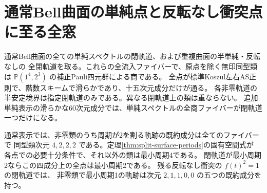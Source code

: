 \section{通常Bell曲面の単純点と反転なし衝突点に至る全窓}
\label{sec:split-surface-all-fibers}
\begin{theorem}\label{thm:split-surface-all-fibers}
通常Bell曲面の全ての単純スペクトルの閉軌道、および重複曲面の半単純・反転なしの
全閉軌道を取る。これらの全流入ファイバーで、原点を除く無印同型類は
$\mathbb P(1^4,2^3)$ の補正Pauli四元群による商である。
全点が標準Koszul左右AS正則で、階数スキームで滑らかであり、十五次元成分だけが通る。
各非零軌道の半安定境界は指定閉軌道のみである。異なる閉軌道上の類は重ならない。
追加単純表示の滑らかな60次元成分では、単純スペクトルの全商ファイバーが閉軌道一つだけになる。

通常表示では、非零類のうち周期が2を割る軌跡の既約成分は全てのファイバーで
同型類次元 $4,2,2,2$ である。定理\ref{thm:split-surface-periods}の固有空間式が
各点での必要十分条件で、それ以外の類は最小周期4である。
閉軌道が最小周期2ならこの四成分上の全点は最小周期2である。
残る反転なし衝突の $f(t)^2=1$ の閉軌道では、
非零類で最小周期1の軌跡は次元 $2,1,1,0,0$ の五つの既約成分を持つ。
\end{theorem}
